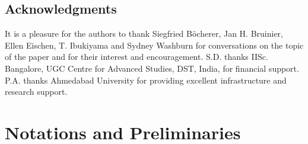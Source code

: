 \documentclass[11pt]{amsart}
\numberwithin{equation}{section}
\begin{document}
\subsection*{Acknowledgments}
{\small
It is a pleasure for the authors to thank Siegfried B\"ocherer, Jan H. Bruinier, Ellen Eischen, T. Ibukiyama and Sydney Washburn for conversations on the topic of the paper and for their interest and encouragement.
S.D. thanks IISc. Bangalore, UGC Centre for Advanced Studies, DST, India, 
for financial support.
P.A. thanks Ahmedabad University for providing excellent infrastructure and research support.
}


\section{Notations and Preliminaries}
\label{prelim}
\end{document}
